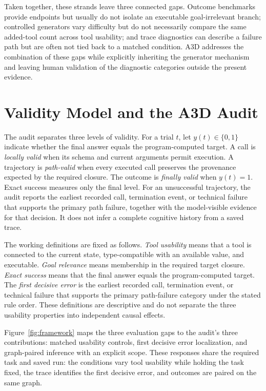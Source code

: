 \documentclass[pdflatex,sn-basic]{sn-jnl}
\begin{document}
Taken together, these strands leave three connected gaps. Outcome benchmarks
provide endpoints but usually do not isolate an executable goal-irrelevant branch;
controlled generators vary difficulty but do not necessarily compare the same
added-tool count across tool usability; and trace diagnostics can
describe a failure path but are often not tied back to a matched condition.
A3D addresses the combination of these gaps while explicitly inheriting the
generator mechanism and leaving human validation of the diagnostic categories
outside the present evidence.

\section{Validity Model and the A3D Audit}

The audit separates three levels of validity. For a trial \(t\), let \(y(t)\in
\{0,1\}\) indicate whether the final answer equals the program-computed target.
A call is \emph{locally valid} when its schema and current arguments permit
execution. A trajectory is \emph{path-valid} when every executed call preserves
the provenance expected by the required closure. The outcome is \emph{finally
valid} when \(y(t)=1\). Exact success measures only the final level. For an
unsuccessful trajectory, the audit reports the earliest recorded call, termination
event, or technical failure that supports the primary path failure, together
with the model-visible evidence for that decision. It does
not infer a complete cognitive history from a saved trace.

The working definitions are fixed as follows. \emph{Tool usability} means that
a tool is connected to the current state, type-compatible with an available
value, and executable. \emph{Goal relevance} means membership in the
required target closure. \emph{Exact success} means that the final answer equals
the program-computed target. The \emph{first decisive error} is the earliest
recorded call, termination event, or technical failure that supports the
primary path-failure category under the stated rule order. These definitions
are descriptive and do not separate the three
usability properties into independent causal effects.

Figure~\ref{fig:framework} maps the three evaluation gaps to the audit's three
contributions: matched usability controls, first decisive error localization, and
graph-paired inference with an explicit scope. These responses share the
required task and saved run: the conditions vary tool usability while holding
the task fixed, the trace identifies the first decisive error, and outcomes are
paired on the same graph.
\end{document}
